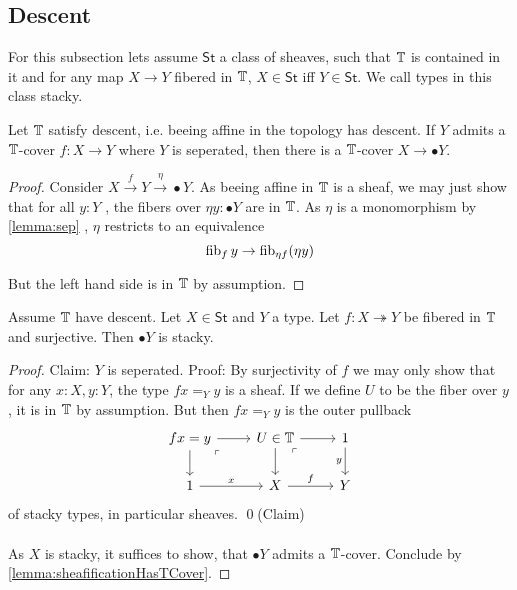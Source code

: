 \documentclass{article}
\newcommand{\St}{\mathsf{St}}
\begin{document}
\subsection{Descent}
For this subsection lets assume $\St$ a class of sheaves, such that $\mathbb{T}$ is contained in it and for any map $X \to Y$ fibered in $\mathbb{T}$, $X \in \St$ iff $Y \in \St$. We call types in this class stacky.
\begin{lemma}{\label{lemma:sheafificationHasTCover}}
	Let $\mathbb{T}$ satisfy descent, i.e. beeing affine in the topology has descent. If $Y$ admits a $\mathbb{T}$-cover $f : X \to Y$ where $Y$ is seperated, then there is a $\mathbb{T}$-cover $X \to \bullet Y$.
\end{lemma}
\begin{proof}
	
	Consider $X \overset{f}{\to} Y \overset{\eta}{\to} \bullet Y$. As beeing affine in $\mathbb{T}$ is  a sheaf, we may just show that for all $y : Y$ , the fibers over $\eta y : \bullet Y$ are in $\mathbb{T}$. As $\eta$ is a monomorphism by \ref{lemma:sep} , $\eta$ restricts to an equivalence
	\[
	\operatorname{fib}_f y \to \operatorname{fib}_{ \eta f}(\eta y)
	\]
	
	But the left hand side is in $\mathbb{T}$ by assumption. 
\end{proof}
\begin{lemma}
 Assume $\mathbb{T}$ have descent.
Let $X \in \St$ and $Y$ a type.	Let $f : X \twoheadrightarrow Y$ be fibered in $\mathbb{T}$ and surjective. Then $\bullet Y$ is stacky.
\end{lemma}
\begin{proof}
Claim: $Y$ is seperated. Proof: By surjectivity of $f$ we may only show that for any $x : X, y : Y$, the type $f x =_Y y$ is a sheaf. If we define $U$ to be the fiber over $y$, it is in $\mathbb{T}$ by assumption. But then $f x =_Y y$ is the outer pullback
\[\begin{tikzcd}
	{f x = y} & {U \in\bT} & 1 \\
	\arrow["\ulcorner"{anchor=center, pos=0.125}, draw=none, from=1-1, to=2-2]
	1 & X & Y
	\arrow[from=1-1, to=1-2]
	\arrow[from=1-1, to=2-1]
	\arrow[from=1-2, to=1-3]
	\arrow[from=1-2, to=2-2]
	\arrow["\ulcorner"{anchor=center, pos=0.125}, draw=none, from=1-2, to=2-3]
	\arrow["y"', from=1-3, to=2-3]
	\arrow["x", from=2-1, to=2-2]
	\arrow["f", from=2-2, to=2-3]
\end{tikzcd}\]
of stacky types, in particular sheaves. \qed(Claim) \\\\
As $X$ is stacky, it suffices to show, that $\bullet Y$ admits a $\mathbb{T}$-cover.
Conclude by \ref{lemma:sheafificationHasTCover}.
\end{proof}
\end{document}
